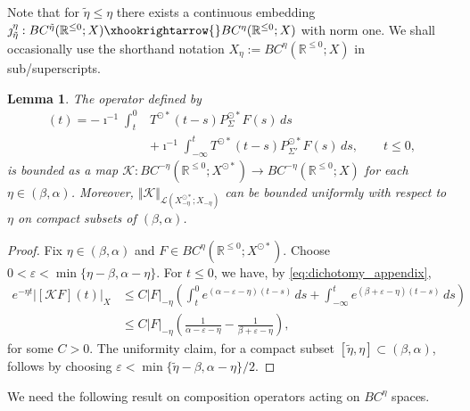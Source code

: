\documentclass[a4paper, 12pt, oneside, reqno, notitlepage]{amsart}
\theoremstyle{plain}
\newtheorem{lemma}[theorem]{Lemma}
\theoremstyle{definition}
\theoremstyle{remark}
\begin{document}
Note that for $ \tilde{\eta} \leq \eta$ there exists a continuous embedding $\jmath_{ \tilde{\eta}}^\eta : BC^{\tilde{\eta}} (\mathbb{R}^{\leq 0};X) \xhookrightarrow{} BC^\eta (\mathbb{R}^{\leq 0};X)$ with norm one.
We shall occasionally use the shorthand notation $X_\eta := BC^\eta (\mathbb{R}^{\leq 0};X)$ in sub/superscripts.


\begin{lemma} \label{lemma:mathcalK}
    The operator defined by
    \begin{align}
        [\mathcal{K} F](t) =- \imath^{-1} \int_t^0 &T^{\odot *} (t-s) P_{\Sigma}^{\odot *} F(s) \, ds \nonumber\\
         &+ \imath^{-1} \int_{-\infty}^t T^{\odot *} (t-s) P_{\Sigma'}^{\odot *} F(s) \, ds, \qquad t \leq 0, \label{eq:mathcalK}
    \end{align}
    is bounded as a map $\mathcal{K}: BC^{-\eta} (\mathbb{R}^{\leq 0};X^{\odot *}) \to BC^{-\eta} (\mathbb{R}^{\leq 0};X)$ for each $\eta \in (\beta,\alpha)$.
    Moreover, $\Vert \mathcal{K} \Vert_{\mathcal{L}(X_{-\eta}^{\odot *};X_{-\eta})}$ can be bounded uniformly with respect to $\eta$ on compact subsets of $(\beta,\alpha)$. 
\end{lemma}

\begin{proof}
    Fix $\eta \in (\beta,\alpha)$ and $F \in BC^\eta (\mathbb{R}^{\leq 0};X^{\odot *})$.
    Choose $0 <\varepsilon < \min \{\eta-\beta,\alpha-\eta\}$.
    For $t \leq 0$, we have, by \eqref{eq:dichotomy_appendix},
    \begin{align*}
        e^{-\eta t}\left|[\mathcal{K} F](t) \right|_X &\leq C |F|_{-\eta} \left( \int_t^0 e^{( \alpha - \varepsilon-\eta)(t-s)} \, ds +  \int_{-\infty}^t e^{( \beta + \varepsilon-\eta)(t-s)} \, ds  \right) \\ 
        &\leq C |F|_{-\eta} \left( \frac{1}{\alpha - \varepsilon-\eta} - \frac{1}{\beta + \varepsilon-\eta} \right),
    \end{align*}
    for some $C > 0$.
    The uniformity claim, for a compact subset $[\tilde{\eta},\eta] \subset (\beta,\alpha)$, follows by choosing $\varepsilon < \min\{\tilde{\eta}-\beta,\alpha-\eta\}/2$.
\end{proof}

We need the following result on composition operators acting on $BC^\eta$ spaces.
\end{document}
